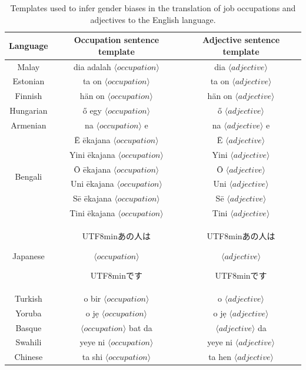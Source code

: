 \documentclass[twoside,11pt]{article}
\begin{document}
\begin{table}[H]
	\centering
	\small{
	\begin{tabular}{|c|c|c|}
		\hline
		Language & Occupation sentence template & Adjective sentence template \\ \hline \hline
		Malay & dia adalah $\langle occupation \rangle$ & dia $\langle adjective \rangle$ \\ \hline
		Estonian & ta on $\langle occupation \rangle$ & ta on $\langle adjective \rangle$ \\ \hline
		Finnish & hän on $\langle occupation \rangle$ & hän on $\langle adjective \rangle$ \\ \hline
		Hungarian & ő egy $\langle occupation \rangle$ & ő $\langle adjective \rangle$ \\ \hline
		Armenian & na $\langle occupation \rangle$ e & na $\langle adjective \rangle$ e \\ \hline
		\multirow{6}{*}{Bengali} & Ē ēkajana $\langle occupation \rangle$ & Ē $\langle adjective \rangle$\\
		 & Yini ēkajana $\langle occupation \rangle$ & Yini $\langle adjective \rangle$\\
		 & Ō ēkajana $\langle occupation \rangle$ & Ō $\langle adjective \rangle$\\
		 & Uni ēkajana $\langle occupation \rangle$ & Uni $\langle adjective \rangle$\\
		 & Sē ēkajana $\langle occupation \rangle$ & Sē $\langle adjective \rangle$\\
		 & Tini ēkajana $\langle occupation \rangle$ & Tini $\langle adjective \rangle$\\ \hline
		Japanese & \begin{CJK*}{UTF8}{min}あの人は\end{CJK*} $\langle occupation \rangle$ \begin{CJK*}{UTF8}{min}です\end{CJK*} & \begin{CJK*}{UTF8}{min}あの人は\end{CJK*} $\langle adjective \rangle$ \begin{CJK*}{UTF8}{min}です\end{CJK*}\\ \hline
		Turkish & o bir $\langle occupation \rangle$ & o $\langle adjective \rangle$ \\ \hline
		Yoruba & o jẹ $\langle occupation \rangle$ & o jẹ $\langle adjective \rangle$ \\ \hline
		Basque & $\langle occupation \rangle$ bat da & $\langle adjective \rangle$ da \\ \hline
		Swahili & yeye ni $\langle occupation \rangle$ & yeye ni $\langle adjective \rangle$ \\ \hline
		Chinese & ta shi $\langle occupation \rangle$ & ta hen $\langle adjective \rangle$ \\ \hline
	\end{tabular}
	}
	\caption{Templates used to infer gender biases in the translation of job occupations and adjectives to the English language.}
	\label{tab:templates}
\end{table}
\end{document}
